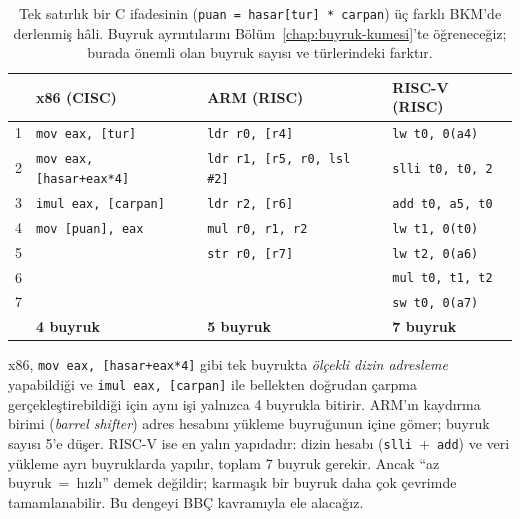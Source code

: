 \begin{table}[H]
\centering
\caption[Aynı C kodunun üç farklı BKM'de derlenmesi]{Tek satırlık bir C ifadesinin (\texttt{puan = hasar[tur] * carpan}) üç farklı BKM'de derlenmiş hâli. Buyruk ayrıntılarını Bölüm~\ref{chap:buyruk-kumesi}'te öğreneceğiz; burada önemli olan buyruk sayısı ve türlerindeki farktır.}
\label{tab:buyruk-karsilastirma}
\small
\begin{tabular}{@{}c@{\quad}l@{\qquad}l@{\qquad}l@{}}
\toprule
 & \textbf{x86 (CISC)} & \textbf{ARM (RISC)} & \textbf{RISC-V (RISC)} \\
\midrule
1 & \texttt{mov eax, [tur]}          & \texttt{ldr r0, [r4]}             & \texttt{lw t0, 0(a4)} \\
2 & \texttt{mov eax, [hasar+eax*4]}  & \texttt{ldr r1, [r5, r0, lsl \#2]} & \texttt{slli t0, t0, 2} \\
3 & \texttt{imul eax, [carpan]}      & \texttt{ldr r2, [r6]}             & \texttt{add t0, a5, t0} \\
4 & \texttt{mov [puan], eax}         & \texttt{mul r0, r1, r2}           & \texttt{lw t1, 0(t0)} \\
5 &                                  & \texttt{str r0, [r7]}             & \texttt{lw t2, 0(a6)} \\
6 &                                  &                                   & \texttt{mul t0, t1, t2} \\
7 &                                  &                                   & \texttt{sw t0, 0(a7)} \\
\midrule
  & \textbf{4 buyruk}                & \textbf{5 buyruk}                 & \textbf{7 buyruk} \\
\bottomrule
\end{tabular}
\end{table}

x86, \texttt{mov eax, [hasar+eax*4]} gibi tek buyrukta \emph{ölçekli dizin adresleme} yapabildiği ve \texttt{imul eax, [carpan]} ile bellekten doğrudan çarpma gerçekleştirebildiği için aynı işi yalnızca 4 buyrukla bitirir. ARM'ın kaydırma birimi (\emph{barrel shifter}) adres hesabını yükleme buyruğunun içine gömer; buyruk sayısı 5'e düşer. RISC-V ise en yalın yapıdadır: dizin hesabı (\texttt{slli}~+~\texttt{add}) ve veri yükleme ayrı buyruklarda yapılır, toplam 7 buyruk gerekir. Ancak ``az buyruk~=~hızlı'' demek değildir; karmaşık bir buyruk daha çok çevrimde tamamlanabilir. Bu dengeyi BBÇ kavramıyla ele alacağız.

